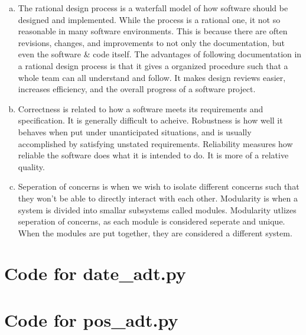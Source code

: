 \documentclass[12pt]{article}
\begin{document}
\begin{enumerate}[(a)]
\item
The rational design process is a waterfall model of how software should be designed and implemented. While the process is a rational one, it not so reasonable in many software environments. This is because there are often revisions, changes, and improvements to not only the documentation, but even the software \& code itself. 
\newline
The advantages of following documentation in a rational design process is that it gives a organized procedure such that a whole team can all understand and follow. It makes design reviews easier, increases efficiency, and the overall progress of a software project.  

\item
Correctness is related to how a software meets its requirements and specification. It is generally difficult to acheive. Robustness is how well it behaves when put under unanticipated situations, and is usually accomplished by satisfying unstated requirements. Reliability measures how reliable the software does what it is intended to do. It is more of a relative quality.

\item
Seperation of concerns is when we wish to isolate different concerns such that they won't be able to directly interact with each other. Modularity is when a system is divided into smallar subsystems called modules. Modularity utlizes seperation of concerns, as each module is considered seperate and unique. When the modules are put together, they are considered a different system.


\end{enumerate}

\newpage

\lstset{language=Python, basicstyle=\tiny, breaklines=true, showspaces=false,
  showstringspaces=false, breakatwhitespace=true}

\def\thesection{\Alph{section}}

\section{Code for date\_adt.py}

\noindent 

\newpage

\section{Code for pos\_adt.py}
\end{document}
